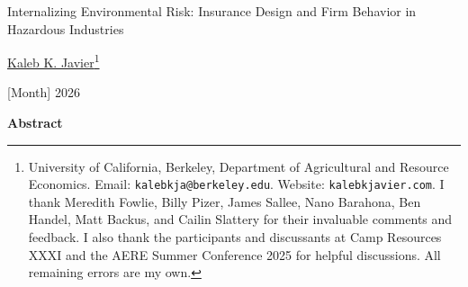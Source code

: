 \renewcommand{\thefootnote}{\fnsymbol{footnote}}

\thispagestyle{empty}

\begin{center}
\vspace*{3cm}

{\Large Internalizing Environmental Risk: Insurance Design and Firm Behavior in Hazardous Industries}

\vspace{1cm}

{\normalsize \href{https://www.kalebkjavier.com}{Kaleb K. Javier}\footnote{University of California, Berkeley, Department of Agricultural and Resource Economics. Email: \texttt{kalebkja@berkeley.edu}. Website: \texttt{kalebkjavier.com}. I thank Meredith Fowlie, Billy Pizer, James Sallee, Nano Barahona, Ben Handel, Matt Backus, and Cailin Slattery for their invaluable comments and feedback. I also thank the participants and discussants at Camp Resources XXXI and the AERE Summer Conference 2025 for helpful discussions. All remaining errors are my own.}}

\vspace{0.2cm}

{\normalsize [Month] 2026}

\end{center}

\vspace{.2cm}

\begin{center}
{\small \textbf{Abstract}}
\end{center}

